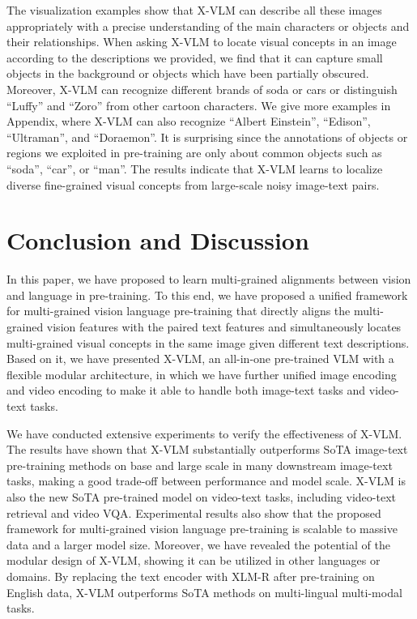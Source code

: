 \documentclass{article}
\newcommand{\baby}{X-VLM\xspace}
\begin{document}
The visualization examples show that \baby can describe all these images appropriately with a precise understanding of the main characters or objects and their relationships. When asking \baby to locate visual concepts in an image according to the descriptions we provided, we find that it can capture small objects in the background or objects which have been partially obscured. Moreover, \baby can recognize different brands of soda or cars or distinguish ``Luffy'' and ``Zoro'' from other cartoon characters. We give more examples in Appendix, where \baby can also recognize ``Albert Einstein'', ``Edison'', ``Ultraman'', and ``Doraemon''. It is surprising since the annotations of objects or regions we exploited in pre-training are only about common objects such as ``soda'', ``car'', or ``man''. The results indicate that \baby learns to localize diverse fine-grained visual concepts from large-scale noisy image-text pairs.  
\section{Conclusion and Discussion}
In this paper, we have proposed to learn multi-grained alignments between vision and language in pre-training. To this end, we have proposed a unified framework for multi-grained vision language pre-training that directly aligns the multi-grained vision features with the paired text features and simultaneously locates multi-grained visual concepts in the same image given different text descriptions. Based on it, we have presented \baby, an all-in-one pre-trained VLM with a flexible modular architecture, in which we have further unified image encoding and video encoding to make it able to handle both image-text tasks and video-text tasks. 


We have conducted extensive experiments to verify the effectiveness of \baby. The results have shown that \baby substantially outperforms SoTA image-text pre-training methods on base and large scale in many downstream image-text tasks, making a good trade-off between performance and model scale. \baby is also the new SoTA pre-trained model on video-text tasks, including video-text retrieval and video VQA. Experimental results also show that the proposed framework for multi-grained vision language pre-training is scalable to massive data and a larger model size. Moreover, we have revealed the potential of the modular design of \baby, showing it can be utilized in other languages or domains. By replacing the text encoder with XLM-R after pre-training on English data, \baby outperforms SoTA methods on multi-lingual multi-modal tasks. 
\end{document}
